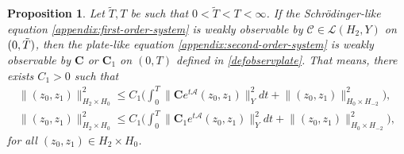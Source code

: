 \documentclass[10pt]{amsart}
\newtheorem{proposition}[theorem]{Proposition}
\theoremstyle{definition}
\let\mc\mathcal
\newcommand{\A}{\mc{A}}
\newcommand{\bC}{\boldsymbol{C}}
\providecommand{\norm}[1]{\lVert#1\rVert}
\begin{document}
\begin{proposition}\label{prop:w-plates-schr}
Let $\widetilde{T},T$ be such that $0 < \widetilde{T} < T < \infty$. If the Schrödinger-like equation
\eqref{appendix:first-order-system} is weakly observable by $\mc{C}\in \mc{L}(H_2, Y)$ on $(0, \Tilde{T})$, then the plate-like equation \eqref{appendix:second-order-system} is weakly observable by $\bC$ or $\bC_1$ on $(0, T)$ defined in \eqref{defobservplate}. That means, there exists $C_1>0$ such that
\begin{align}\label{ineq:wobs-plates}
\norm{(z_0, z_1)}_{H_2\times H_0}^2\leq C_1\biggl(\int_0^T \norm{\bC e^{t\A}(z_0, z_1)}_{Y}^2dt+\norm{(z_0, z_1)}_{H_{0}\times H_{-2}}^2\biggr),\\
\norm{(z_0, z_1)}_{H_2\times H_0}^2\leq C_1\biggl(\int_0^T \norm{\bC_1 e^{t\A}(z_0, z_1)}_{Y}^2dt+\norm{(z_0, z_1)}_{H_{0}\times H_{-2}}^2\biggr),
\end{align}
for all $(z_0, z_1)\in H_2\times H_0$.
\end{proposition}
\end{document}
